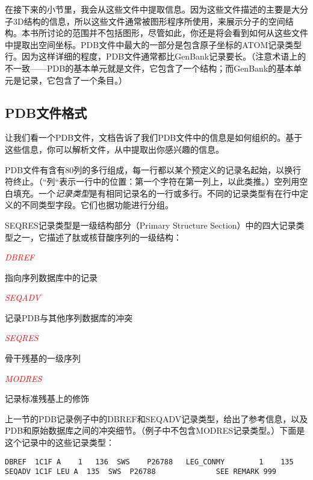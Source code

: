 在接下来的小节里，我会从这些文件中提取信息。因为这些文件描述的主要是大分子3D结构的信息，所以这些文件通常被图形程序所使用，来展示分子的空间结构。本书所讨论的范围并不包括图形，尽管如此，你还是将会看到如何从这些文件中提取出空间坐标。PDB文件中最大的一部分是包含原子坐标的ATOM记录类型行。因为这样详细的程度，PDB文件通常都比GenBank记录要长。（注意术语上的不一致——PDB的基本单元就是文件，它包含了一个结构；而GenBank的基本单元是记录，它包含了一个条目。）

\subsection{PDB文件格式}
让我们看一个PDB文件，文档告诉了我们PDB文件中的信息是如何组织的。基于这些信息，你可以解析文件，从中提取出你感兴趣的信息。

PDB文件有含有80列的多行组成，每一行都以某个预定义的记录名起始，以换行符终止。（“列“表示一行中的位置：第一个字符在第一列上，以此类推。）空列用空白填充。一个\textit{记录类型}是有相同记录名的一行或多行。不同的记录类型有在行中定义的不同类型字段。它们也据功能进行分组。

SEQRES记录类型是一级结构部分（Primary Structure Section）中的四大记录类型之一，它描述了肽或核苷酸序列的一级结构：

\textcolor{red}{\textit{DBREF}}
\begin{adjustwidth}{1cm}{}
指向序列数据库中的记录
\end{adjustwidth}

\textcolor{red}{\textit{SEQADV}}
\begin{adjustwidth}{1cm}{}
记录PDB与其他序列数据库的冲突
\end{adjustwidth}

\textcolor{red}{\textit{SEQRES}}
\begin{adjustwidth}{1cm}{}
骨干残基的一级序列
\end{adjustwidth}

\textcolor{red}{\textit{MODRES}}
\begin{adjustwidth}{1cm}{}
记录标准残基上的修饰
\end{adjustwidth}

上一节的PDB记录例子中的DBREF和SEQADV记录类型，给出了参考信息，以及PDB和原始数据库之间的冲突细节。（例子中不包含MODRES记录类型。）下面是这个记录中的这些记录类型：

\begin{lstlisting}
DBREF  1C1F A    1   136  SWS    P26788   LEG_CONMY        1    135             
SEQADV 1C1F LEU A  135  SWS  P26788              SEE REMARK 999 
\end{lstlisting}

